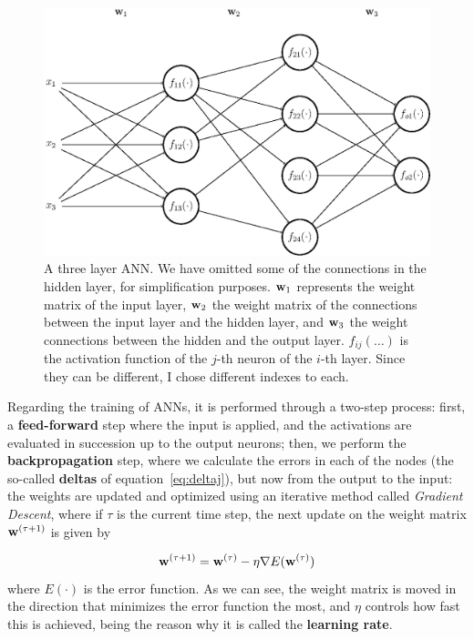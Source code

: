 \begin{figure}[H]
	\centering
	\includegraphics[width=0.9\linewidth]{figures/ann.eps}
    \caption[Three layer ANN]{A three layer ANN. We have omitted some of the connections in the hidden layer, for simplification purposes. $\mathbf{w}_1$ represents the weight matrix of the input layer, $\mathbf{w}_2$ the weight matrix of the connections between the input layer and the hidden layer, and $\mathbf{w}_3$ the weight connections between the hidden and the output layer. $f_{ij}(\dots)$ is the activation function of the $j$-th neuron of the $i$-th layer. Since they can be different, I chose different indexes to each.}
	\label{fig:neuralnet}
\end{figure}

Regarding the training of ANNs, it is performed through a two-step process: first, a \textbf{feed-forward} step where the input is applied, and the activations are evaluated in succession up to the output neurons; then, we perform the \textbf{backpropagation} step, where we calculate the errors in each of the nodes (the so-called \textbf{deltas} of equation~\ref{eq:deltaj}), but now from the output to the input: the weights are updated and optimized using an iterative  method called \textit{Gradient Descent}, where if $\tau$ is the current time step, the next update on the weight matrix $\mathbf{w}^{(\tau+1)}$ is given by

\begin{equation}\label{eq:gradDesc}
	\mathbf{w}^{(\tau+1)} = \mathbf{w}^{(\tau)} - \eta \nabla E(\mathbf{w}^{(\tau)})
\end{equation}
where $E(\cdot)$ is the error function. As we can see, the weight matrix is moved in the direction that minimizes the error function the most, and $\eta$ controls how fast this is achieved, being the reason why it is called the \textbf{learning rate}.

